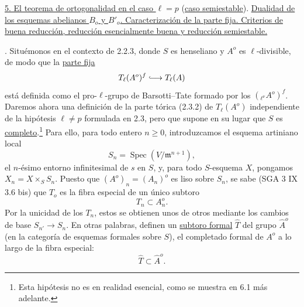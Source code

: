 \par\medskip
\noindent
\underline{5. El teorema de ortogonalidad en el caso $\ell=p$} (\underline{caso
semiestable}). \underline{Dualidad de los esquemas abelianos $B_o$ y $B'_o$.
Caracterización de la parte fija. Criterios de buena reducción,
reducción esencialmente buena y reducción semiestable.}

\medskip
{}. Situémonos en el contexto de 2.2.3, donde $S$ es henseliano y
$A^o$ es $\ell$-divisible, de modo que la \underline{parte fija}
\[
 T_\ell(A^o)^f\lhook\joinrel\longrightarrow T_\ell(A)
\]
está definida como el pro-$\ell$-grupo de Barsotti--Tate formado por
los $({}_{\ell^\nu}A^o)^f$. Daremos ahora una definición de la parte
tórica (2.3.2) de $T_\ell(A^o)$ independiente de la hipótesis
$\ell\neq p$ formulada en 2.3, pero que supone en su lugar que $S$ es
\underline{completo}.\footnote{Esta hipótesis no es en realidad
esencial, como se muestra en 6.1 más adelante.} Para ello, para todo
entero $n\geq0$, introduzcamos el esquema artiniano local
\begin{equation}\tag{5.1.1}
 S_n=\operatorname{Spec}(V/\mathfrak m^{n+1}),
\end{equation}
el $n$-ésimo entorno infinitesimal de $s$ en $S$, y, para todo
$S$-esquema $X$, pongamos $X_n=X\times_S S_n$. Puesto que
$(A^o)_n=(A_n)^o$ es liso sobre $S_n$, se sabe (SGA 3 IX 3.6 bis) que
$T_o$ es la fibra especial de un único subtoro
\begin{equation}\tag{5.1.2}
 T_n\subset A_n^o.
\end{equation}
Por la unicidad de los $T_n$, estos se obtienen unos de otros mediante
los cambios de base $S_{n'}\longrightarrow S_n$. En otras palabras,
definen un \underline{subtoro formal} $\widehat T$ del grupo
$\widehat A^o$ (en la categoría de esquemas formales sobre $S$), el
completado formal de $A^o$ a lo largo de la fibra especial:
\begin{equation}\tag{5.1.3}
 \widehat T\subset\widehat A^o.
\end{equation}


